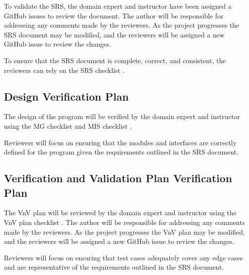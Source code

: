 \documentclass[12pt, titlepage]{article}
\begin{document}
To validate the SRS, the domain expert and instructor have been assigned a
GitHub issues to review the document. The author will be responsible for
addressing any comments made by the reviewers. As the project progresses
the SRS document may be modified, and the reviewers will be assigned a new
GitHub issue to review the changes.

To ensure that the SRS document is complete, correct, and consistent, the
reviewers can rely on the SRS checklist \cite{SRSChecklist}.

\subsection{Design Verification Plan}

The design of the \progname{} program will be verified by the domain expert and
instructor using the MG checklist \cite{MGChecklist} and MIS checklist \cite{MISChecklist}.

Reviewers will focus on ensuring that the modules and interfaces are correctly
defined for the \progname{} program given the requirements outlined in the SRS
document.





\subsection{Verification and Validation Plan Verification Plan}

The VnV plan will be reviewed by the domain expert and instructor using the 
VnV plan checklist \cite{VnVChecklist}. The author will be responsible for
addressing any comments made by the reviewers. As the project progresses the
VnV plan may be modified, and the reviewers will be assigned a new GitHub issue
to review the changes.

Reviewers will focus on ensuring that test cases adequately cover any edge cases
and are representative of the requirements outlined in the SRS document.



\end{document}
